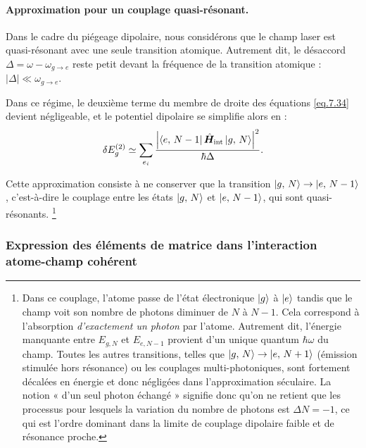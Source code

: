 \paragraph{Approximation pour un couplage quasi-résonant.}

Dans le cadre du piégeage dipolaire, nous considérons que le champ laser est quasi-résonant avec une seule transition atomique. 
Autrement dit, le désaccord \(\Delta = \omega - \omega_{g \rightarrow e}\) reste petit devant la fréquence de la transition atomique :
\(
|\Delta| \ll \omega_{g \rightarrow e}.
\)

Dans ce régime, le deuxième terme du membre de droite des équations \eqref{eq.7.34} devient négligeable, et le potentiel dipolaire se simplifie alors en :
\begin{eqnarray}\label{eq:potentiel_dipolaire_simplifie}
\delta E_g^{(2)} \simeq \sum_{e_i} \frac{\left| \bra{e,\,N-1} \hat{\bm{H}}_{\mathrm{int}} \ket{g,\,N} \right|^2}
{\hbar \Delta} .
\end{eqnarray}


Cette approximation consiste à ne conserver que la transition 
\(\ket{g,\,N} \rightarrow \ket{e,\,N-1}\), c’est-à-dire le couplage 
entre les états \(\ket{g,\,N}\) et \(\ket{e,\,N-1}\), qui sont 
quasi-résonants.%
\footnote{
Dans ce couplage, l’atome passe de l’état électronique 
\(\ket{g}\) à \(\ket{e}\) tandis que le champ voit son nombre de photons 
diminuer de \(N\) à \(N-1\).  
Cela correspond à l’absorption \emph{d’exactement un photon} par l’atome.  
Autrement dit, l’énergie manquante entre \(E_{g,N}\) et \(E_{e,N-1}\) 
provient d’un unique quantum \(\hbar\omega\) du champ.  
Toutes les autres transitions, telles que 
\(\ket{g,\,N} \rightarrow \ket{e,\,N+1}\) (émission stimulée hors résonance) 
ou les couplages multi-photoniques, sont fortement décalées en énergie et 
donc négligées dans l’approximation séculaire.  
La notion « d’un seul photon échangé » signifie donc qu’on ne retient que 
les processus pour lesquels la variation du nombre de photons est 
\(\Delta N = -1\), ce qui est l’ordre dominant dans la limite 
de couplage dipolaire faible et de résonance proche.}






\subsubsection*{Expression des éléments de matrice dans l’interaction atome-champ cohérent}

